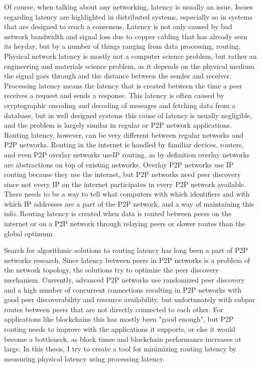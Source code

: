 Of course, when talking about any networking, latency is usually an issue. Issues regarding latency are highlighted in distributed systems, especially so in systems that are designed to reach a consensus. Latency is not only caused by bad network bandwidth and signal loss due to copper cabling that has already seen its heyday, but by a number of things ranging from data processing, routing. Physical network latency is mostly not a computer science problem, but rather an engineering and materials science problem, as it depends on the physical medium the signal goes through and the distance between the sender and receiver. Processing latency means the latency that is created between the time a peer receives a request and sends a response. This latency is often caused by cryptographic encoding and decoding of messages and fetching data from a database, but in well designed systems this cause of latency is usually negligible, and the problem is largely similar in regular or P2P network applications. Routing latency, however, can be very different between regular networks and P2P networks. Routing in the internet is handled by familiar devices, routers, and even P2P overlay networks useIP routing, as by definition overlay networks are abstractions on top of existing networks. Overlay P2P networks use IP routing because they use the internet, but P2P networks need peer discovery since not every IP on the internet participates in every P2P network available. There needs to be a way to tell what computers with which identifiers and with which IP addresses are a part of the P2P network, and a way of maintaining this info. Routing latency is created when data is routed between peers on the internet or on a P2P network through relaying peers or slower routes than the global optimum.

Search for algorithmic solutions to routing latency has long been a part of P2P networks research. Since latency between peers in P2P networks is a problem of the network topology, the solutions try to optimize the peer discovery mechanism. Currently, advanced P2P networks use randomized peer discovery and a high number of concurrent connections resulting in P2P networks with good peer discoverability and resource availability, but unfortunately with subpar routes between peers that are not directly connected to each other. For applications like blockchains this has mostly been "good enough", but P2P routing needs to improve with the applications it supports, or else it would become a bottleneck, as block times and blockchain performance increases at large. In this thesis, I try to create a tool for minimizing routing latency by measuring physical latency using processing latency. 

